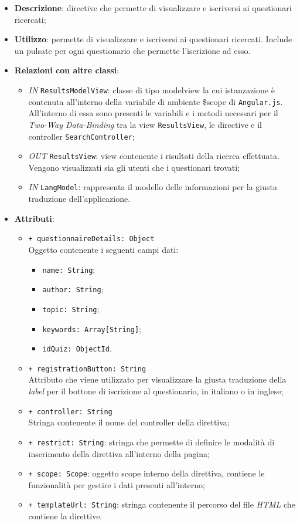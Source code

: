 \begin{itemize}
	\item \textbf{Descrizione}: directive che permette di visualizzare e iscriversi ai questionari ricercati;
	\item \textbf{Utilizzo}: permette di visualizzare e iscriversi ai questionari ricercati. Include un pulsate per ogni questionario che permette l'iscrizione ad esso.
	\item \textbf{Relazioni con altre classi}:
	\begin{itemize}
		\item \textit{IN} \texttt{ResultsModelView}: classe di tipo modelview la cui istanzazione è contenuta all'interno della variabile di ambiente \$scope di \texttt{Angular.js}. All'interno di essa sono presenti le variabili e i metodi necessari per il \textit{Two-Way Data-Binding} tra la view \texttt{ResultsView}, le directive e il controller \texttt{SearchController};
		\item \textit{OUT} \texttt{ResultsView}: view contenente i risultati della ricerca effettuata. Vengono visualizzati sia gli utenti che i questionari trovati;
		\item \textit{IN} \texttt{LangModel}: rappresenta il modello delle informazioni per la giusta traduzione dell'applicazione.
	\end{itemize}
	\item \textbf{Attributi}:
	\begin{itemize}
		\item \texttt{+ questionnaireDetails: Object} \\ Oggetto contenente i seguenti campi dati:
			\begin{itemize}
				\item \texttt{name: String};
				\item \texttt{author: String};
				\item \texttt{topic: String};
				\item \texttt{keywords: Array[String]};
				\item \texttt{idQuiz: ObjectId}.
			\end{itemize}
		\item \texttt{+ registrationButton: String} \\ Attributo che viene utilizzato per visualizzare la giusta traduzione della \textit{label} per il bottone di iscrizione al questionario, in italiano o in inglese;
		\item \texttt{+ controller: String} \\ Stringa contenente il nome del controller della direttiva;
		\item \texttt{+ restrict: String}: stringa che permette di definire le modalità di inserimento della direttiva all'interno della pagina;
		\item \texttt{+ scope: Scope}: oggetto scope interno della direttiva, contiene le funzionalità per gestire i dati presenti all'interno;
		\item \texttt{+ templateUrl: String}: stringa contenente il percorso del file \textit{HTML} che contiene la direttive.
	\end{itemize}
\end{itemize}